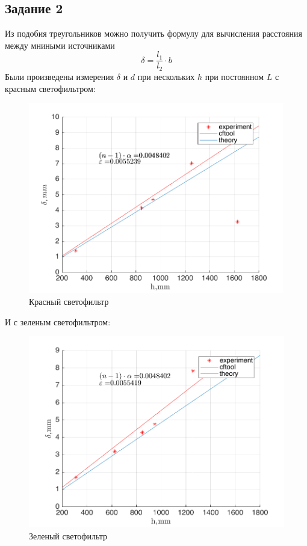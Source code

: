 \subsection{Задание 2}
Из подобия треугольников можно получить формулу для вычисления расстояния между мниными источниками 
\begin{equation}
	\delta=\frac{l_1}{l_2}\cdot b
\end{equation}
Были произведены измерения $\delta$ и $d$ при нескольких $h$ при постоянном $L$ с красным светофильтром:

\begin{figure}[H]
	\centering 
	\includegraphics[width=0.995\textwidth]{data/d_r.png}
	\caption{Красный светофильтр}
	\label{fig:d_r}
\end{figure}

И с зеленым светофильтром:

\begin{figure}[H]
	\centering
	\includegraphics[width=1\textwidth]{data/d_g.png}
	\caption{Зеленый светофильтр}
	\label{fig:d_g}
\end{figure}

